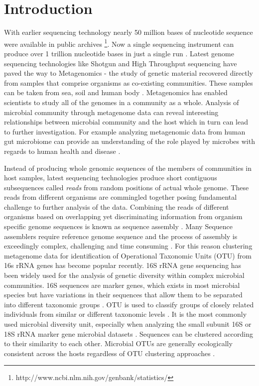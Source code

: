 \documentclass[10pt, conference, compsocconf]{IEEEtran}
\begin{document}
\section{Introduction}
\label{intro}
With earlier sequencing technology nearly 50 million bases of nucleotide sequence were available in public archives \footnote{http://www.ncbi.nlm.nih.gov/genbank/statistics/}. Now a single sequencing instrument can produce over 1 trillion nucleotide bases in just a single run \cite{MARGenomeOr}. Latest genome sequencing technologies like Shotgun and High Throughput sequencing have paved the way to Metagenomics - the study of genetic material recovered directly from samples that comprise organisms as co-existing communities. These samples can be taken from sea, soil and human body \cite{MARSeaMetaGenome}\cite{MARHumanGut}. Metagenomics has enabled scientists to study all of the genomes in a community as a whole. Analysis of microbial community through metagenome data can reveal interesting relationships between microbial community and the host which in turn can lead to further investigation. For example analyzing metagenomic data from human gut microbiome can provide an understanding of the role played by microbes with regards to human health and disease \cite{MARHumanMicro}.

Instead of producing whole genomic sequences of the members of communities in host samples, latest sequencing technologies produce short contiguous subsequences called \textit{reads} from random positions of actual whole genome. These reads from different organisms are commingled together posing fundamental challenge to further analysis of the data. Combining the reads of different organisms based on overlapping yet discriminating information from organism specific genome sequences is known as sequence assembly \cite{MARDosphila}. Many Sequence assemblers require reference genome sequence and the process of assembly is exceedingly complex, challenging and time consuming \cite{MARCharuvaka}. For this reason clustering metagenome data for identification of Operational Taxonomic Units (OTU) from 16s rRNA genes has become popular recently. 16S rRNA gene sequencing has been widely used for the analysis of genetic diversity within complex microbial communities. 16S sequences are marker genes, which exists in most microbial species but have variations in their sequences that allow them to be separated into different taxonomic groups \cite{MAR16S}. OTU is used to classify groups of closely related individuals from similar or different taxonomic levels \cite{MAROTU}. It is the most commonly used microbial diversity unit, especially when analyzing the small subunit 16S or 18S rRNA marker gene microbial datasets \cite{MAROTU2}. Sequences can be clustered according to their similarity to each other. Microbial OTUs are generally ecologically consistent across the hosts regardless of OTU clustering approaches \cite{MAROTUConsistant}.
\end{document}
